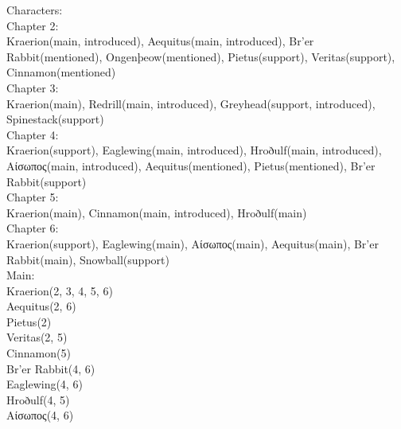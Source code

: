 



Characters:\\[1cm]
Chapter 2:\\[0.1cm]
Kraerion(main, introduced),
Aequitus(main, introduced),
Br'er Rabbit(mentioned),
Ongenþeow(mentioned),
Pietus(support),
Veritas(support),
Cinnamon(mentioned)\\[0.1cm]

Chapter 3:\\[0.1cm]
Kraerion(main),
Redrill(main, introduced),
Greyhead(support, introduced),
Spinestack(support)\\[1cm]

Chapter 4:\\[0.1cm]
Kraerion(support),
Eaglewing(main, introduced), 
Hroðulf(main, introduced), 
Αίσωπος(main, introduced),
Aequitus(mentioned),
Pietus(mentioned),
Br'er Rabbit(support)\\[0.1cm]

Chapter 5:\\[0.1cm]
Kraerion(main),
Cinnamon(main, introduced),
Hroðulf(main)\\[0.1cm]

Chapter 6:\\[0.1cm]
Kraerion(support),
Eaglewing(main),
Αίσωπος(main),
Aequitus(main),
Br'er Rabbit(main),
Snowball(support)\\[0.1cm]

Main: \\[0.1cm]
Kraerion(2, 3, 4, 5, 6)\\
Aequitus(2, 6)\\
Pietus(2)\\
Veritas(2, 5)\\
Cinnamon(5)\\
Br'er Rabbit(4, 6)\\
Eaglewing(4, 6)\\
Hroðulf(4, 5)\\
Αίσωπος(4, 6)\\
 \\[0.1cm]